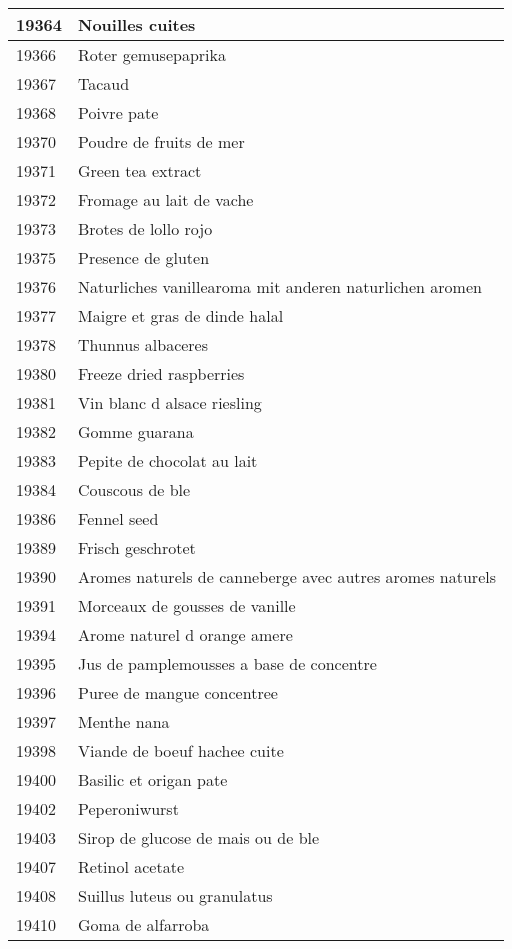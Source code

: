 \begin{longtable}{|l|l|}
19364 & Nouilles cuites \\ \hline 
19366 & Roter gemusepaprika \\ \hline 
19367 & Tacaud \\ \hline 
19368 & Poivre pate \\ \hline 
19370 & Poudre de fruits de mer \\ \hline 
19371 & Green tea extract \\ \hline 
19372 & Fromage au lait de vache \\ \hline 
19373 & Brotes de lollo rojo \\ \hline 
19375 & Presence de gluten \\ \hline 
19376 & Naturliches vanillearoma mit anderen naturlichen aromen \\ \hline 
19377 & Maigre et gras de dinde halal \\ \hline 
19378 & Thunnus albaceres \\ \hline 
19380 & Freeze dried raspberries \\ \hline 
19381 & Vin blanc d alsace riesling \\ \hline 
19382 & Gomme guarana \\ \hline 
19383 & Pepite de chocolat au lait \\ \hline 
19384 & Couscous de ble \\ \hline 
19386 & Fennel seed \\ \hline 
19389 & Frisch geschrotet \\ \hline 
19390 & Aromes naturels de canneberge avec autres aromes naturels \\ \hline 
19391 & Morceaux de gousses de vanille \\ \hline 
19394 & Arome naturel d orange amere \\ \hline 
19395 & Jus de pamplemousses a base de concentre \\ \hline 
19396 & Puree de mangue concentree \\ \hline 
19397 & Menthe nana \\ \hline 
19398 & Viande de boeuf hachee cuite \\ \hline 
19400 & Basilic et origan pate \\ \hline 
19402 & Peperoniwurst \\ \hline 
19403 & Sirop de glucose de mais ou de ble \\ \hline 
19407 & Retinol acetate \\ \hline 
19408 & Suillus luteus ou granulatus \\ \hline 
19410 & Goma de alfarroba \\ \hline 

\end{longtable}
